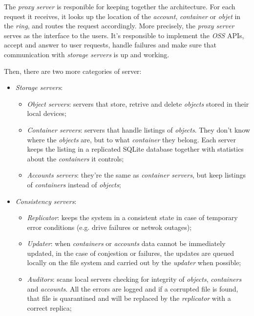 \noindent
The \emph{proxy server} is responible for keeping together the architecture.
For each request it receives, it looks up the location of the \emph{account},
\emph{container} or \emph{objet} in the \emph{ring}, and routes the request
accordingly. More precisely, the \emph{proxy server} serves as the interface
to the users. It's responsible to implement the \emph{OSS} APIs, accept and
answer to user requests, handle failures and make sure that communication with
\emph{storage servers} is up and working.

Then, there are two more categories of server:
\begin{itemize}
    \item \emph{Storage servers}:
    \begin{itemize}
        \item \emph{Object servers}: servers that store, retrive and delete
        \emph{objects} stored in their local devices;
        \item \emph{Container servers}: servers that handle listings of
        \emph{objects}. They don't know where the \emph{objects} are, but to
        what \emph{container} they belong. Each server keeps the listing in a
        replicated SQLite database together with statistics about the
        \emph{containers} it controls;
        \item \emph{Accounts servers}: they're the same as \emph{container servers},
        but keep listings of \emph{containers} instead of \emph{objects};
    \end{itemize}
    \item \emph{Consistency servers}:
    \begin{itemize}
        \item \emph{Replicator}: keeps the system in a consistent state in case
        of temporary error conditions (e.g. drive failures or netwok outages);
        \item \emph{Updater}: when \emph{containers} or \emph{accounts} data
        cannot be immediately updated, in the case of conjestion or failures,
        the updates are queued locally on the file system and carried out by
        the \emph{updater} when possible;
        \item \emph{Auditors}: scans local servers checking for integrity of
        \emph{objects}, \emph{containers} and \emph{accounts}. All the errors
        are logged and if a corrupted file is found, that file is quarantined
        and will be replaced by the \emph{replicator} with a correct replica;
    \end{itemize}
\end{itemize}

